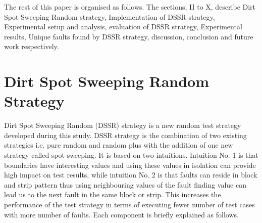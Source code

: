 \documentclass[conference]{IEEEtran}
\begin{document}
The rest of this paper is organised as follows. The sections, II to X, describe Dirt Spot Sweeping Random strategy, Implementation of DSSR strategy, Experimental setup and analysis, evaluation of DSSR strategy, Experimental results, Unique faults found by DSSR strategy, discussion, conclusion and future work respectively.




\section{Dirt Spot Sweeping Random Strategy}
Dirt Spot Sweeping Random (DSSR) strategy is a new random test strategy developed during this study. DSSR strategy is the combination of two existing strategies i.e. pure random and random plus with the addition of one new strategy called spot sweeping. It is based on two intuitions. Intuition No. 1 is that boundaries have interesting values and using these values in isolation can provide high impact on test results, while intuition No. 2 is that faults can reside in block and strip pattern thus using neighbouring values of the fault finding value can lead us to the next fault in the same block or strip. This increases the performance of the test strategy in terms of executing fewer number of test cases with more number of faults. Each component is briefly explained as follows.
\end{document}
